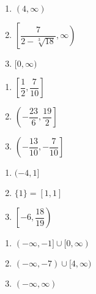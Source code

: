 \documentclass[11pt]{article}
\theoremstyle{definition}  %
\newcounter{HW}
\begin{document}
\begin{multicols}{3}
\begin{enumerate}
\setcounter{enumi}{\value{HW}}

\item $(4, \infty)$\vphantom{$\left[ \dfrac{7}{2 - \sqrt[3]{18}}, \infty\right)$
}

\item  $\left[ \dfrac{7}{2 - \sqrt[3]{18}}, \infty\right)$

\item   $[0, \infty)$\vphantom{$\left[ \dfrac{7}{2 - \sqrt[3]{18}}, \infty\right)$
}

\setcounter{HW}{\value{enumi}}
\end{enumerate}
\end{multicols}


\begin{multicols}{3}
\begin{enumerate}
\setcounter{enumi}{\value{HW}}

\item $\left[ \dfrac{1}{2}, \dfrac{7}{10}\right]$
\item $\left(-\dfrac{23}{6}, \dfrac{19}{2} \right]$
\item $\left(-\dfrac{13}{10}, -\dfrac{7}{10} \right]$

\setcounter{HW}{\value{enumi}}
\end{enumerate}
\end{multicols}

\begin{multicols}{3}
\begin{enumerate}
\setcounter{enumi}{\value{HW}}
\item  $(-4,1]$\vphantom{$\left[-6, \dfrac{18}{19} \right)$}

\item  $\{1 \} = [1,1]$ \vphantom{$\left[-6, \dfrac{18}{19} \right)$}

\item  $\left[-6, \dfrac{18}{19} \right)$

\setcounter{HW}{\value{enumi}}
\end{enumerate}
\end{multicols}


\begin{multicols}{3}
\begin{enumerate}
\setcounter{enumi}{\value{HW}}
\item  $(-\infty, -1] \cup [0, \infty)$ 
\item   $(-\infty, -7) \cup [4, \infty)$
\item   $(-\infty, \infty)$

\setcounter{HW}{\value{enumi}}
\end{enumerate}
\end{multicols}
\end{document}

